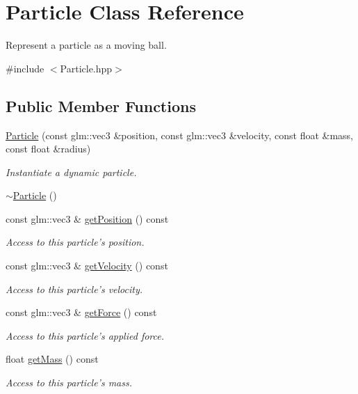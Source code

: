 \hypertarget{classParticle}{\section{Particle Class Reference}
\label{classParticle}
}


Represent a particle as a moving ball.  




{\ttfamily \#include $<$Particle.\+hpp$>$}

\subsection*{Public Member Functions}
\begin{DoxyCompactItemize}
\item 
\hyperlink{classParticle_a8e0174413f7c34f67ca992552e409ced}{Particle} (const glm\+::vec3 \&position, const glm\+::vec3 \&velocity, const float \&mass, const float \&radius)
\begin{DoxyCompactList}\small\item\em Instantiate a dynamic particle. \end{DoxyCompactList}\item 
\hyperlink{classParticle_ad030d0fe7b88cf81744b127c99244ff4}{$\sim$\+Particle} ()
\item 
const glm\+::vec3 \& \hyperlink{classParticle_a40b65e9c27b1265ac48ce4925e37f619}{get\+Position} () const 
\begin{DoxyCompactList}\small\item\em Access to this particle's position. \end{DoxyCompactList}\item 
const glm\+::vec3 \& \hyperlink{classParticle_af976b4aa95a792454c75d2143e0bf5cf}{get\+Velocity} () const 
\begin{DoxyCompactList}\small\item\em Access to this particle's velocity. \end{DoxyCompactList}\item 
const glm\+::vec3 \& \hyperlink{classParticle_a9bde826461065bc609e7a859cca54b8d}{get\+Force} () const 
\begin{DoxyCompactList}\small\item\em Access to this particle's applied force. \end{DoxyCompactList}\item 
float \hyperlink{classParticle_af11c8e6d590e50496d637b3822e4fdaa}{get\+Mass} () const 
\begin{DoxyCompactList}\small\item\em Access to this particle's mass. \end{DoxyCompactList}\item 

\end{DoxyCompactItemize}
